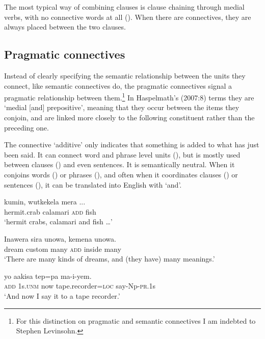 The most typical way of combining clauses is clause chaining through medial verbs, with no connective words at all (). When there are connectives, they are always placed between the two clauses. 

\subsection{Pragmatic connectives}
{}
Instead of clearly specifying the semantic relationship between the units they connect, like semantic connectives do, the pragmatic connectives signal a pragmatic relationship between them.\footnote{For this distinction on pragmatic and semantic connectives I am indebted to Stephen Levinsohn.} In Haspelmath's (2007:8) terms they are `medial [and] prepositive', meaning that they occur between the items they conjoin, and are linked more closely to the following constituent rather than the preceding one.

The connective  `additive' only indicates that something is added to what has just been said. It can connect word and phrase level units (), but is mostly used between clauses () and even sentences. It is semantically neutral. When it conjoins words () or phrases (), and often when it coordinates clauses () or sentences (), it can be translated into English with `and'. 

\ea%
\label{ex:x711}
\gll kumin, wutkekela  mera ... \\
hermit.crab calamari \textsc{add} fish\\
\glt`hermit crabs, calamari and fish {\dots}'
\z

\ea%
\label{ex:x713}
\gll Inawera sira unowa,  kemena unowa. \\
dream custom many \textsc{add} inside many\\
\glt`There are many kinds of dreams, and (they have) many meanings.'
\z

\ea%
\label{ex:x714}
\gll {} yo aakisa tep=pa ma-i-yem. \\
\textsc{add} 1s.\textsc{unm} now tape.recorder=\textsc{loc} say-Np-\textsc{pr}.1s\\
\glt`And now I say it to a tape recorder.'
\z

